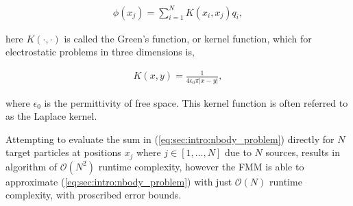\documentclass{IEEEcsmag}
\begin{document}
\begin{eqnarray}
	\phi(x_j) = \sum_{i=1}^{N} K(x_i, x_j) q_i,
\label{eq:sec:intro:nbody_problem}
\end{eqnarray}

here $K(\cdot, \cdot)$ is called the Green's function, or kernel function, which for electrostatic problems in three dimensions is,

\begin{eqnarray}
	K(x, y) = \frac{1}{4\epsilon_0\pi|x-y|},
\label{eq:sec:intro:laplace_kernel}
\end{eqnarray}

where $\epsilon_0$ is the permittivity of free space. This kernel function is often referred to as the Laplace kernel.

Attempting to evaluate the sum in (\ref{eq:sec:intro:nbody_problem}) directly for $N$ target particles at positions $x_j$ where $j \in [1,...,N]$ due to $N$ sources, results in algorithm of $\mathcal{O}(N^2)$ runtime complexity, however the FMM is able to approximate (\ref{eq:sec:intro:nbody_problem}) with just $\mathcal{O}(N)$ runtime complexity, with proscribed error bounds.
\end{document}
